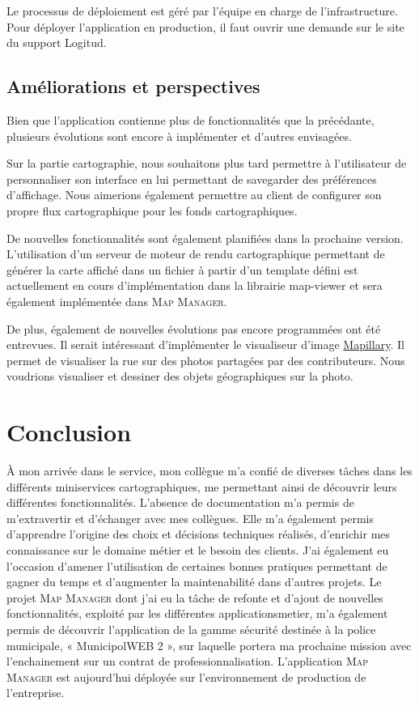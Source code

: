 \documentclass{rapportUHA40}
\begin{document}
Le processus de déploiement est géré par l'équipe en charge de
l'infrastructure. Pour déployer l'application en production, il faut ouvrir une
demande sur le site du support Logitud.

\subsection{Améliorations et perspectives}
Bien que l'application contienne plus de fonctionnalités que la précédante,
plusieurs évolutions sont encore à implémenter et d'autres envisagées.

Sur la partie cartographie, nous souhaitons plus tard permettre à l'utilisateur
de personnaliser son interface en lui permettant de savegarder des préférences
d'affichage. Nous aimerions également permettre au client de configurer son
propre flux cartographique pour les fonds cartographiques.

De nouvelles fonctionnalités sont également planifiées dans la prochaine
version. L'utilisation d'un serveur de moteur de rendu cartographique
permettant de générer la carte affiché dans un fichier à partir d'un template
défini est actuellement en cours d'implémentation dans la librairie map-viewer
et sera également implémentée dans \textsc{Map Manager}.

De plus, également de nouvelles évolutions pas encore programmées ont été
entrevues. Il serait intéressant d'implémenter le visualiseur d'image
\href{https://www.mapillary.com/app/}{Mapillary}. Il permet de visualiser la
rue sur des photos partagées par des contributeurs. Nous voudrions visualiser
et dessiner des objets géographiques sur la photo.

\section{Conclusion}
À mon arrivée dans le service, mon collègue m’a confié de diverses tâches dans
les différents miniservices cartographiques, me permettant ainsi de découvrir
leurs différentes fonctionnalités. L'absence de documentation m'a permis de
m’extravertir et d’échanger avec mes collègues. Elle m’a également permis
d’apprendre l’origine des choix et décisions techniques réalisés, d’enrichir mes
connaissance sur le domaine métier et le besoin des clients. J’ai également eu
l’occasion d’amener l’utilisation de certaines bonnes pratiques permettant de gagner
du temps et d’augmenter la maintenabilité dans d'autres projets.
Le projet \textsc{Map Manager} dont j'ai eu la tâche de refonte et d'ajout de nouvelles
fonctionnalités, exploité par les différentes \gls{applicationsmetier}, m’a également permis
de découvrir l’application de la gamme sécurité destinée à la police municipale,
« MunicipolWEB 2 », sur laquelle portera ma prochaine mission avec l’enchainement
sur un contrat de professionnalisation. L'application \textsc{Map Manager} est aujourd'hui déployée sur
l'environnement de production de l'entreprise.
\end{document}
